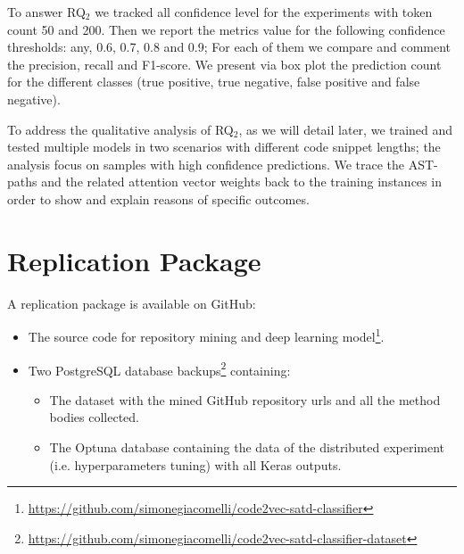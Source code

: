 To answer RQ$_2$ we tracked all confidence level for the experiments with token count 50 and 200. Then we report the metrics value for the following confidence thresholds: any, 0.6, 0.7, 0.8 and 0.9; For each of them we compare and comment the precision, recall and F1-score. We present via box plot the prediction count for the different classes (true positive, true negative, false positive and false negative). 

To address the qualitative analysis of RQ$_2$, as we will detail later, we trained and tested multiple models in two scenarios with different code snippet lengths; the analysis focus on samples with high confidence predictions. We trace the AST-paths and the related attention vector weights back to the training instances in order to show and explain reasons of specific outcomes.



\section{Replication Package}
A replication package is available on GitHub:
\begin{itemize}
    \item The source code for repository mining and deep learning model\footnote{\url{https://github.com/simonegiacomelli/code2vec-satd-classifier}}. 
    \item Two PostgreSQL database backups\footnote{\url{https://github.com/simonegiacomelli/code2vec-satd-classifier-dataset}} containing:
    \begin{itemize}
\item The dataset with the mined GitHub repository urls and all the method bodies collected.
\item The Optuna database containing the data of the distributed experiment (i.e. hyperparameters tuning) with all Keras outputs. 
\end{itemize}
\end{itemize}
